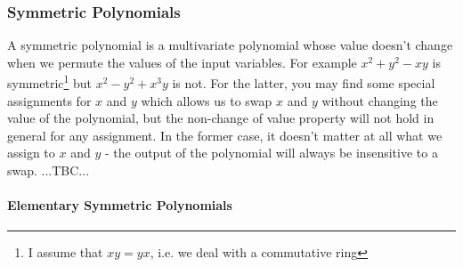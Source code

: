 \subsubsection{Symmetric Polynomials}
A symmetric polynomial is a multivariate polynomial whose value doesn't change when we permute the values of the input variables. For example $x^2 + y^2 - xy$ is symmetric\footnote{I assume that $xy = yx$, i.e. we deal with a commutative ring} but  $x^2 - y^2 + x^3 y$ is not. For the latter, you may find some special assignments for $x$ and $y$ which allows us to swap $x$ and $y$ without changing the value of the polynomial, but the non-change of value property will not hold in general for any assignment. In the former case, it doesn't matter at all what we assign to $x$ and $y$ - the output of the polynomial will always be insensitive to a swap. ...TBC...


\paragraph{Elementary Symmetric Polynomials}








